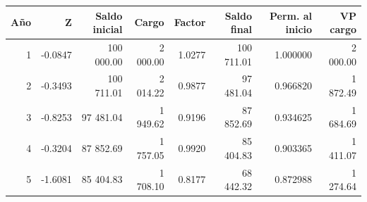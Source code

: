 \begin{tabular}{rrrrrrrr}
\toprule
Año & Z & Saldo inicial & Cargo & Factor & Saldo final & Perm. al inicio & VP cargo \\
\midrule
1 & -0.0847 & 100 000.00 & 2 000.00 & 1.0277 & 100 711.01 & 1.000000 & 2 000.00 \\
2 & -0.3493 & 100 711.01 & 2 014.22 & 0.9877 & 97 481.04 & 0.966820 & 1 872.49 \\
3 & -0.8253 & 97 481.04 & 1 949.62 & 0.9196 & 87 852.69 & 0.934625 & 1 684.69 \\
4 & -0.3204 & 87 852.69 & 1 757.05 & 0.9920 & 85 404.83 & 0.903365 & 1 411.07 \\
5 & -1.6081 & 85 404.83 & 1 708.10 & 0.8177 & 68 442.32 & 0.872988 & 1 274.64 \\
\bottomrule
\end{tabular}
